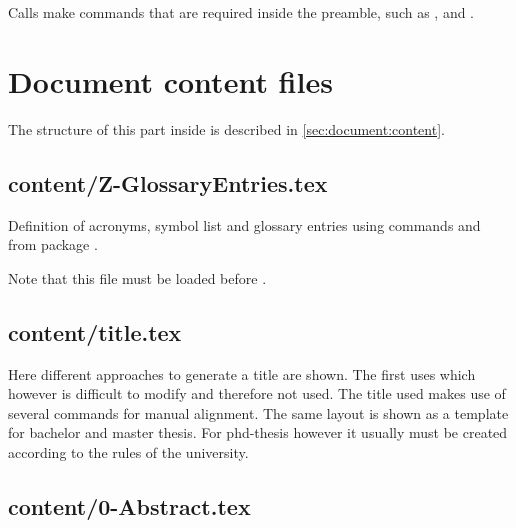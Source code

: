 Calls make commands that are required inside the preamble, such as 
,  and .


\chapter{Document content files}

The structure of this part inside  is described in  \vref{sec:document:content}.

\section{content/Z-GlossaryEntries.tex}

Definition of acronyms, symbol list and glossary entries using commands   and  from package .

Note that this file must be loaded before .


\section{content/title.tex}

Here different approaches to generate a title are shown. The first uses  which however is difficult to modify and therefore not used. The title used makes use of several  commands for manual alignment. The same layout is shown as a template for bachelor and master thesis. For phd-thesis however it usually must be created according to the rules of the university.


\section{content/0-Abstract.tex}

